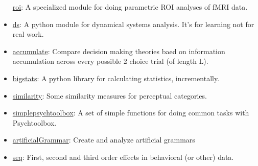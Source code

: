 \begin{itemize}
  \href{https://github.com/parenthetical-e/roi}{roi}: A specialized
  module for doing parametric ROI analyses of fMRI data.
\item
  \href{https://github.com/parenthetical-e/ds}{ds}: A python module for
  dynamical systems analysis. It's for learning not for real work.
\item
  \href{http://parenthetical-e.github.io/accumulate/}{accumulate}:
  Compare decision making theories baed on information accumulation
  across every possible 2 choice trial (of length L).
\item
  \href{https://github.com/parenthetical-e/bigstats}{bigstats}: A python
  library for calculating statistics, incrementally.
\item
  \href{https://github.com/parenthetical-e/similarity}{similarity}: Some
  similarity measures for perceptual categories.
\item
  \href{https://github.com/parenthetical-e/simplepsychtoolbox}{simplepsychtoolbox}:
  A set of simple functions for doing common tasks with Psychtoolbox.
\item
  \href{https://github.com/parenthetical-e/artificialGrammar}{artificialGrammar}:
  Create and analyze artificial grammars
\item
  \href{https://github.com/parenthetical-e/seq}{seq}: First, second and
  third order effects in behavioral (or other) data.
\end{itemize}
